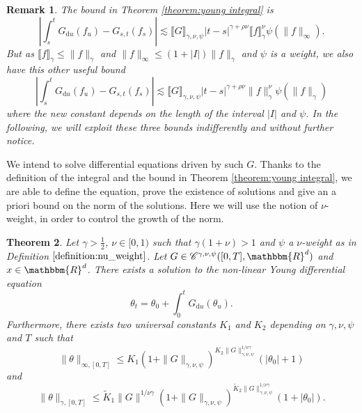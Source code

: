 \documentclass[a4paper,11pt]{article}
\newcommand{\mathd}{\mathrm{d}}
\newtheorem{theorem}{Theorem}[section]
\newtheorem{remark}[theorem]{Remark}
\newcommand{\CC}{\mathscr C}
\begin{document}
\begin{remark}
  The bound in Theorem \ref{theorem:young integral} is
  \[ \left\lvert \int_{s}^{t} G_{\mathd u} ( f_{u} ) -G_{s,t} ( f_{s} ) \right\lvert
     \lesssim \llbracket G \rrbracket_{\gamma , \nu , \psi} | t-s |^{\gamma +
     \rho \nu} \llbracket f \rrbracket_{\gamma}^{\nu} \psi ( \| f \|_{\infty}
     ) . \]
  But as $\llbracket f \rrbracket_{\gamma} \leqslant \| f \|_{\gamma}$ and $\|
  f \|_{\infty} \leqslant ( 1+ | I | ) \| f \|_{\gamma}$ and $\psi$ is a
  weight, we also have this other useful bound
  \[ \left\lvert \int_{s}^{t} G_{\mathd u} ( f_{u} ) -G_{s,t} ( f_{s} ) \right\lvert
     \lesssim \llbracket G \rrbracket_{\gamma , \nu , \psi} | t-s |^{\gamma +
     \rho \nu} \| f \|_{\gamma}^{\nu} \psi ( \| f \|_{\gamma} ) \]
  where the new constant depends on the length of the interval $| I |$ and
  $\psi$. In the following, we will exploit these three bounds indifferently
  and without further notice.
\end{remark}

We intend to solve differential equations driven by such $G$. Thanks to the
definition of the integral and the bound in Theorem \ref{theorem:young
integral}, we are able to define the equation, prove the existence of
solutions and give an a priori bound on the norm of the solutions. Here we
will use the notion of $\nu$-weight, in order to control the growth of the
norm.

\begin{theorem}
  \label{theorem:existence_young_solution}Let $\gamma > \frac{1}{2}$, $\nu \in
  [ 0,1 )$ such that $\gamma ( 1+ \nu ) >1$ and $\psi$ a $\nu$-weight as in
  Definition $\ref{definition:nu_weight}$. Let $G \in \CC^{\gamma , \nu ,
  \psi} ( [ 0,T ] ,\mathbbm{R}^{d} )$ and $x \in \mathbbm{R}^{d}$. There
  exists a solution to the non-linear Young differential equation
  \[ \theta_{t} = \theta_{0} + \int_{0}^{t} G_{\mathd u} ( \theta_{u} ) . \]
  Furthermore, there exists two universal constants $K_{1}$ and $K_{2}$
  depending on $\gamma , \nu , \psi$ and $T$ such that
  \[ \| \theta \|_{\infty , [ 0,T ]} \leqslant K_{1} ( 1+ \| G \|_{\gamma ,
     \nu , \psi} )^{K_{2} \| G \|_{\gamma , \nu , \psi}^{1/ \nu \gamma}} ( |
     \theta_{0} | +1 ) \]
  and
  \[ \| \theta \|_{\gamma , [ 0,T ]} \leqslant \tilde{K}_{1} \| G \|^{1/ \nu
     \gamma} ( 1+ \| G \|_{\gamma , \nu , \psi} )^{\tilde{K}_{2} \| G
     \|_{\gamma , \nu , \psi}^{1/ \nu \gamma}} ( 1+ | \theta_{0} | ) . \]
\end{theorem}
\end{document}
